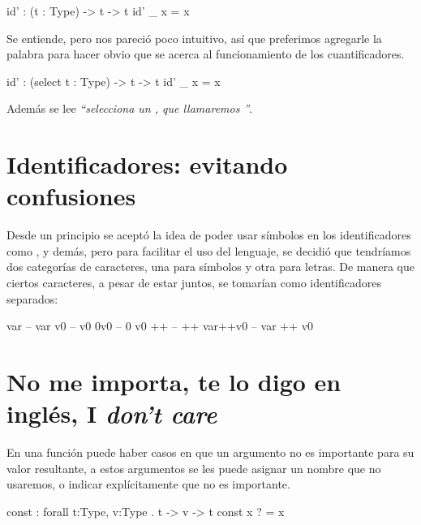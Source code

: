 {\begin{designfr}
\begin{anglercode}
id' : (t : Type) -> t -> t
id' _ x = x
\end{anglercode}

Se entiende, pero nos pareció poco intuitivo, así que preferimos agregarle la palabra  para hacer obvio que se acerca al funcionamiento de los cuantificadores.

\begin{anglercode}
id' : (select t : Type) -> t -> t
id' _ x = x
\end{anglercode}

Además se lee \emph{\enquote{selecciona un , que llamaremos }}.
\end{designfr}

\section{Identificadores: evitando confusiones}

\begin{designfr}
Desde un principio se aceptó la idea de poder usar símbolos en los identificadores como \inlinecode{+}, \inlinecode{*} y demás, pero para facilitar el uso del lenguaje, se decidió que tendríamos dos categorías de caracteres, una para símbolos y otra para letras. De manera que ciertos caracteres, a pesar de estar juntos, se tomarían como identificadores separados:

\begin{anglercode}
var         -- var
v0          -- v0
0v0         -- 0 v0
++          -- ++
var++v0     -- var ++ v0
\end{anglercode}
\end{designfr}

\section{No me importa, te lo digo en inglés, I \emph{don't care}}

\begin{designfr}
En una función puede haber casos en que un argumento no es importante para su valor resultante, a estos argumentos se les puede asignar un nombre que no usaremos, o indicar explícitamente que no es importante.

\begin{anglercode}
const : forall t:Type, v:Type . t -> v -> t
const x ? = x
\end{anglercode}


\end{designfr}}
